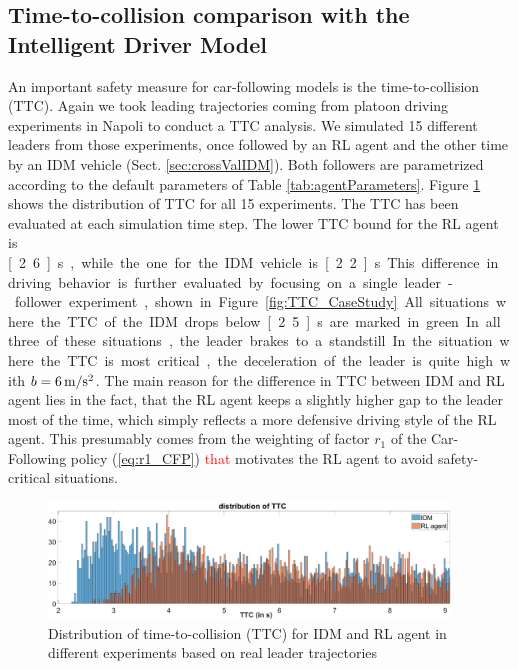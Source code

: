 \documentclass[review]{elsarticle}
\providecommand{\red}[1]{\textcolor{red}{#1}}
\providecommand{\martin}[1]{\red{#1}} %
\providecommand{\3}{{\ss}}
\begin{document}
\subsection{Time-to-collision comparison with the Intelligent Driver Model}

An important safety measure for car-following models is the
time-to-collision (TTC). Again we took leading trajectories coming
from platoon driving experiments in Napoli to conduct a TTC
analysis. We simulated 15 different leaders from those experiments,
once followed by an RL agent and the other time by an IDM vehicle (Sect. \ref{sec:crossValIDM}). Both
followers are parametrized according to the default parameters of Table
\ref{tab:agentParameters}. Figure \ref{fig:DistributionTTC} shows the
distribution of TTC for all 15 experiments. The TTC has been evaluated
at each simulation time step. The lower TTC bound for the RL agent is
\unit[2.6]{s}, while the one for the IDM vehicle is
\unit[2.2]{s}. This difference in driving behavior is further
evaluated by focusing on a single leader-follower experiment, shown in
Figure \ref{fig:TTC_CaseStudy}. All situations where the TTC of the
IDM drops below \unit[2.5]{s} are marked in green. In all three of
these situations, the leader brakes to a standstill. In the situation
where the TTC is most critical, the deceleration of the leader is
quite high with $b = \unit[6]{m/s^2}$. The main reason for the
difference in TTC between IDM and RL agent lies in the fact, that the
RL agent keeps a slightly higher gap to the leader most of the time,
which simply reflects a more defensive driving style of the RL
agent. This presumably comes from the weighting of factor $r_1$  of
the Car-Following policy (\ref{eq:r1_CFP}) \martin{that} motivates the RL agent to avoid safety-critical situations. 

\begin{figure}	
	\centering
	\includegraphics[width=0.95\textwidth]{images/DistributionTTC}
	\caption{Distribution of time-to-collision (TTC) for IDM and RL agent in different experiments based on real leader trajectories}
	\label{fig:DistributionTTC}
\end{figure}
\end{document}
